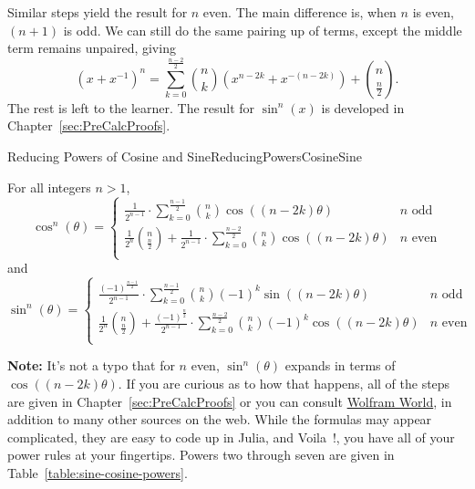 Similar steps yield the result for $n$ even. The main difference is, when \( n \) is even, $(n+1)$ is odd. We can still do the same pairing up of terms, except the middle term remains unpaired, giving
\begin{equation}
    \left(x + x^{-1} \right)^n = \sum_{k=0}^{\frac{n-2}{2}} \binom{n}{k} \left(  x^{n-2k} + x^{-(n-2k)} \right) + \binom{n}{\frac{n}{2}}.
\end{equation}
The rest is left to the learner.  The result for $\sin^n(x)$ is developed in Chapter~\ref{sec:PreCalcProofs}.


\bigskip

\begin{propColor}{Reducing Powers of Cosine and Sine}{ReducingPowersCosineSine} 

For all integers $n>1$,
 \begin{equation}
 \label{eq:BinomialForCosX}
\cos^n(\theta) = \begin{cases} \displaystyle
    \frac{1}{2^{n-1}} \cdot \sum_{k=0}^{ \frac{n-1}{2} }\binom{n}{k} \cos\left( (n-2k) \theta \right) & n \text{ odd} \\[1em]  \displaystyle
  \frac{1}{2^n} \binom{n}{\frac{n}{2}} +  \frac{1}{2^{n-1}} \cdot \sum_{k=0}^{ \frac{n-2}{2} } \binom{n}{k} \cos\left( (n-2k) \theta \right)  & n \text{ even} \\
\end{cases}    
\end{equation}   
and
\begin{equation}
\label{eq:BinomialForSinX}
\sin^n(\theta) = \begin{cases} \displaystyle
    \frac{(-1)^{\frac{n-1}{2}}}{2^{n-1}} \cdot \sum_{k=0}^{\frac{n-1}{2}} \binom{n}{k} (-1)^k \sin\left((n-2k) \theta \right)& n \text{ odd} \\[1em]  \displaystyle
  \frac{1}{2^n} \binom{n}{\frac{n}{2}} + \frac{(-1)^{\frac{n}{2}}}{2^{n-1}}  \cdot\sum_{k=0}^{\frac{n-2}{2}} \binom{n}{k} (-1)^k \cos\left((n-2k) \theta \right) & n \text{ even} \\
\end{cases}    
\end{equation}
\bigskip

\textbf{Note:} It's not a typo that for $n$ even, $\sin^n(\theta)$ expands in terms of $\cos\left( (n-2k)\theta \right)$. If you are curious as to how that happens, all of the steps are given in Chapter~\ref{sec:PreCalcProofs} or you can consult \href{https://mathworld.wolfram.com/TrigonometricPowerFormulas.html}{Wolfram World}, in addition to many other sources on the web. While the formulas may appear complicated, they are easy to code up in Julia, and Voila~!, you have all of your power rules at your fingertips. Powers two through seven are given in Table~\ref{table:sine-cosine-powers}.
\end{propColor}


